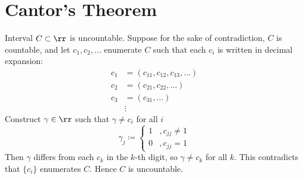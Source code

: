 
\section{Cantor's Theorem}


\begin{theorem}{
    Interval $C\subset\rr$ is uncountable.
}
	Suppose for the sake of contradiction, $C$ is countable, and let $c_1,c_2,\ldots$ enumerate $C$ such that each $c_i$ is written in decimal expansion:
    \begin{align*}
        c_1 &= (c_{11},c_{12},c_{13},\ldots)\\
        c_2 &= (c_{21},c_{22},\ldots)\\
        c_3 &= (c_{31},\ldots)\\
        &\vdots
    \end{align*}
    Construct $\gamma\in\rr$ such that $\gamma\neq c_i$ for all $i$
    \[
        \gamma_j \coloneqq
        \begin{cases}
            1 &, c_{jj} \neq 1\\
            0 &, c_{jj} = 1
        \end{cases}
    \]
    Then $\gamma$ differs from each $c_k$ in the $k$-th digit, so $\gamma\neq c_k$ for all $k$.
    This contradicts that $\{c_i\}$ enumerates $C$.
    Hence $C$ is uncountable.
\end{theorem}